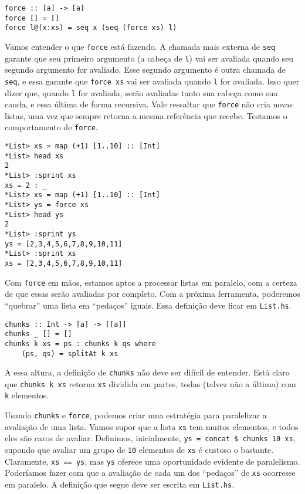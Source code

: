 \documentclass[a4paper]{article}
\begin{document}
\begin{verbatim}
force :: [a] -> [a]
force [] = []
force l@(x:xs) = seq x (seq (force xs) l)
\end{verbatim}

Vamos entender o que \texttt{force} está fazendo.
A chamada mais externa de \texttt{seq} garante que seu primeiro argumento (a cabeça de \texttt{l}) vai ser avaliada quando seu segundo argumento for avaliado.
Esse segundo argumento é outra chamada de \texttt{seq}, e essa garante que \texttt{force xs} vai ser avaliada quando \texttt{l} for avaliada.
Isso quer dizer que, quando \texttt{l} for avaliada, serão avaliadas tanto sua cabeça como sua cauda, e essa última de forma recursiva.
Vale ressaltar que \texttt{force} não cria novas listas, uma vez que sempre retorna a mesma referência que recebe.
Testamos o comportamento de \texttt{force}.

\begin{verbatim}
*List> xs = map (+1) [1..10] :: [Int]
*List> head xs
2
*List> :sprint xs
xs = 2 : _
*List> xs = map (+1) [1..10] :: [Int]
*List> ys = force xs
*List> head ys
2
*List> :sprint ys
ys = [2,3,4,5,6,7,8,9,10,11]
*List> :sprint xs
xs = [2,3,4,5,6,7,8,9,10,11]
\end{verbatim}

Com \texttt{force} em mãos, estamos aptos a processar listas em paralelo, com a certeza de que essas serão avaliadas por completo.
Com a próxima ferramenta, poderemos ``quebrar'' uma lista em ``pedaços'' iguais.
Essa definição deve ficar em \texttt{List.hs}.

\begin{verbatim}
chunks :: Int -> [a] -> [[a]]
chunks _ [] = []
chunks k xs = ps : chunks k qs where
    (ps, qs) = splitAt k xs
\end{verbatim}

A essa altura, a definição de \texttt{chunks} não deve ser difícil de entender.
Está claro que \mbox{\texttt{chunks k xs}} retorna \texttt{xs} dividida em partes, todas (talvez não a última) com \texttt{k} elementos.

Usando \texttt{chunks} e \texttt{force}, podemos criar uma estratégia para paralelizar a avaliação de uma lista.
Vamos supor que a lista \texttt{xs} tem muitos elementos, e todos eles são caros de avaliar.
Definimos, inicialmente, \texttt{ys = concat \$ chunks 10 xs}, supondo que avaliar um grupo de \texttt{10} elementos de \texttt{xs} é custoso o bastante.
Claramente, \texttt{xs == ys}, mas \texttt{ys} oferece uma oportunidade evidente de paralelismo.
Poderíamos fazer com que a avaliação de cada um dos ``pedaços'' de \texttt{xs} ocorresse em paralelo.
A definição que segue deve ser escrita em \texttt{List.hs}.
\end{document}

